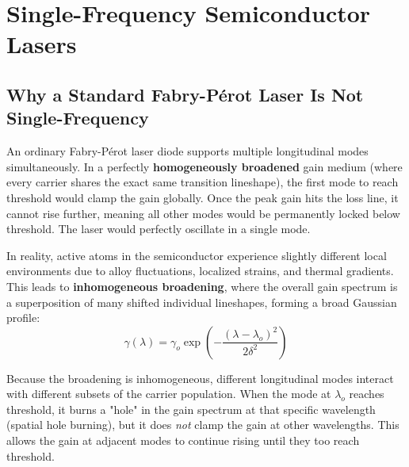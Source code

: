 \section{Single-Frequency Semiconductor Lasers}

\subsection{Why a Standard Fabry-Pérot Laser Is Not Single-Frequency}

An ordinary Fabry-Pérot laser diode supports multiple longitudinal modes simultaneously. In a perfectly \textbf{homogeneously broadened} gain medium (where every carrier shares the exact same transition lineshape), the first mode to reach threshold would clamp the gain globally. Once the peak gain hits the loss line, it cannot rise further, meaning all other modes would be permanently locked below threshold. The laser would perfectly oscillate in a single mode.

In reality, active atoms in the semiconductor experience slightly different local environments due to alloy fluctuations, localized strains, and thermal gradients. This leads to \textbf{inhomogeneous broadening}, where the overall gain spectrum is a superposition of many shifted individual lineshapes, forming a broad Gaussian profile:
\begin{equation*}
    \gamma(\lambda) = \gamma_o \exp\!\left(-\frac{(\lambda - \lambda_o)^2}{2\delta^2}\right)
\end{equation*}

Because the broadening is inhomogeneous, different longitudinal modes interact with different subsets of the carrier population. When the mode at $\lambda_o$ reaches threshold, it burns a "hole" in the gain spectrum at that specific wavelength (spatial hole burning), but it does \emph{not} clamp the gain at other wavelengths. This allows the gain at adjacent modes to continue rising until they too reach threshold.

